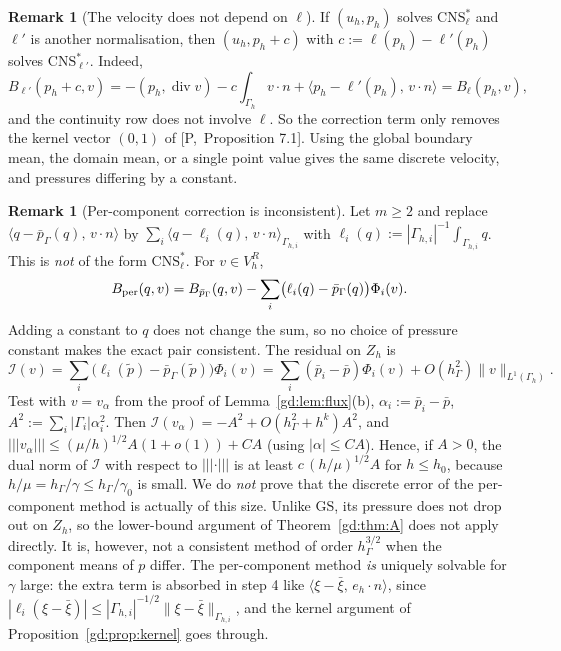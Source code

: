 \documentclass[11pt,reqno]{amsart}
\theoremstyle{plain}
\theoremstyle{definition}
\newtheorem{remark}[theorem]{Remark}
\newcommand{\hG}{h_\Gamma}
\newcommand{\Gh}{\Gamma_h}
\newcommand{\VR}{V_h^R}
\newcommand{\Zh}{Z_h}
\newcommand{\pt}{\tilde p}
\newcommand{\pbar}{\bar p}
\newcommand{\pbG}{\bar p_{\Gamma}}
\newcommand{\ip}[2]{\langle #1,\, #2\rangle}
\newcommand{\tnorm}[1]{|\!|\!|#1|\!|\!|}
\newcommand{\norm}[1]{\lVert #1\rVert}
\newcommand{\GS}{\mathrm{GS}}
\newcommand{\CNS}{\mathrm{CNS}^\ast}
\renewcommand{\div}{\operatorname{div}}
\newcommand{\Pref}[1]{\textup{[P,~#1]}}
\begin{document}
\begin{remark}[The velocity does not depend on $\ell$]\label{gd:rem:ell}
If $(u_h,p_h)$ solves $\CNS_\ell$ and $\ell'$ is another normalisation, then $(u_h,p_h+c)$ with $c:=\ell(p_h)-\ell'(p_h)$ solves $\CNS_{\ell'}$. Indeed,
\[
B_{\ell'}(p_h+c,v)=-(p_h,\div v)-c\int_{\Gh}v\cdot n+\ip{p_h-\ell'(p_h)}{v\cdot n}=B_\ell(p_h,v),
\]
and the continuity row does not involve $\ell$. So the correction term only removes the kernel vector $(0,1)$ of \Pref{Proposition 7.1}. Using the global boundary mean, the domain mean, or a single point value gives the same discrete velocity, and pressures differing by a constant.
\end{remark}

\begin{remark}[Per-component correction is inconsistent]\label{gd:rem:percomp}
Let $m\ge2$ and replace $\ip{q-\pbG(q)}{v\cdot n}$ by $\sum_i\ip{q-\ell_i(q)}{v\cdot n}_{\Gamma_{h,i}}$ with $\ell_i(q):=|\Gamma_{h,i}|^{-1}\int_{\Gamma_{h,i}}q$. This is \emph{not} of the form $\CNS_\ell$. For $v\in\VR$,
\[
B_{\rm per}(q,v)=B_{\pbG}(q,v)-\sum_i\bigl(\ell_i(q)-\pbG(q)\bigr)\Phi_i(v).
\]
Adding a constant to $q$ does not change the sum, so no choice of pressure constant makes the exact pair consistent. The residual on $\Zh$ is
\[
\mathcal I(v)=\sum_i\bigl(\ell_i(\pt)-\pbG(\pt)\bigr)\Phi_i(v)=\sum_i(\bar p_i-\pbar)\Phi_i(v)+O(\hG^2)\norm{v}_{L^1(\Gh)} .
\]
Test with $v=v_\alpha$ from the proof of Lemma~\ref{gd:lem:flux}(b), $\alpha_i:=\bar p_i-\pbar$, $A^2:=\sum_i|\Gamma_i|\alpha_i^2$. Then $\mathcal I(v_\alpha)=-A^2+O(\hG^2+h^k)A^2$, and $\tnorm{v_\alpha}\le(\mu/h)^{1/2}A(1+o(1))+CA$ (using $|\alpha|\le CA$). Hence, if $A>0$, the dual norm of $\mathcal I$ with respect to $\tnorm\cdot$ is at least $c\,(h/\mu)^{1/2}A$ for $h\le h_0$, because $h/\mu=\hG/\gamma\le\hG/\gamma_0$ is small. We do \emph{not} prove that the discrete error of the per-component method is actually of this size. Unlike $\GS$, its pressure does not drop out on $\Zh$, so the lower-bound argument of Theorem~\ref{gd:thm:A} does not apply directly. It is, however, not a consistent method of order $\hG^{3/2}$ when the component means of $p$ differ. The per-component method \emph{is} uniquely solvable for $\gamma$ large: the extra term is absorbed in step 4 like $\ip{\xi-\bar\xi}{e_h\cdot n}$, since $|\ell_i(\xi-\bar\xi)|\le|\Gamma_{h,i}|^{-1/2}\norm{\xi-\bar\xi}_{\Gamma_{h,i}}$, and the kernel argument of Proposition~\ref{gd:prop:kernel} goes through.
\end{remark}
\end{document}
